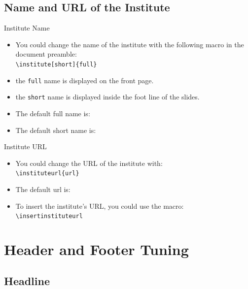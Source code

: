 \documentclass[english,sectioncirclenumberstyle]{ciadbeamer}
\begin{document}
\subsection{Name and URL of the Institute}

\begin{frame}{Institute Name}
	\begin{itemize}
	\item You could change the name of the institute with the following macro in the document preamble: \\
		\texttt{{\textbackslash}institute[short]\{full\}}
	\item the \texttt{full} name is displayed on the front page.
	\item the \texttt{short} name is displayed inside the foot line of the slides.
	\vspace{1em}
	\item The default full name is: \\
		{\smaller\insertinstitute}
	\item The default short name is: \insertshortinstitute
	\end{itemize}
\end{frame}

\begin{frame}{Institute URL}
	\begin{itemize}
	\item You could change the URL of the institute with: \\
		\texttt{{\textbackslash}instituteurl\{url\}}
	\vspace{1em}
	\item The default url is: \insertinstituteurl
	\vspace{1em}
	\item To insert the institute's URL, you could use the macro: \\
			\texttt{{\textbackslash}insertinstituteurl}
	\end{itemize}
\end{frame}

\section{Header and Footer Tuning}
\tableofcontentslide[sectionstyle={show/shaded},subsectionstyle={show/show/hide},subsubsectionstyle={hide/hide/hide/hide},sections={1-6}]

\subsection{Headline}
\end{document}
